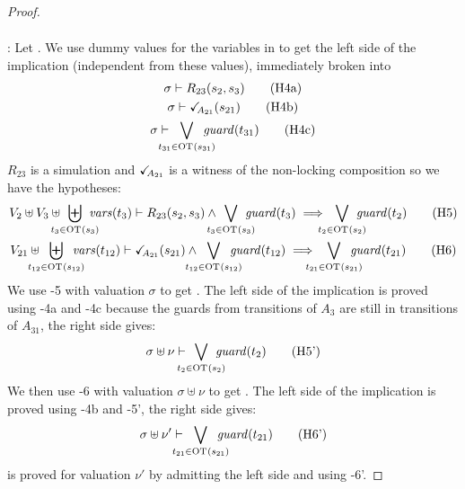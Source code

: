 \documentclass{article}
\begin{document}
\begin{proof}
\begin{align*}
	\end{align*}
\item[\goal{1}:] Let .
	We use dummy values for the variables in  to get the left side of the implication (independent from these values), immediately broken into
	\begin{gather}
		\sigma \vdash R_{23}\mpar{s_2, s_3} \hyp{4a} \\
		\sigma \vdash \reach{A_{21}}\mpar{s_{21}} \hyp{4b} \\
		\sigma \vdash \bigvee_\subbox{t_{31} \in \fOT{s_{31}}} \fguard{t_{31}} \hyp{4c}
	\end{gather}
	\(R_{23}\) is a simulation and \(\checkmark_{\!\! A_{21}}\) is a witness of the non-locking composition so we have the hypotheses:
	\begin{gather}
		V_2 \uplus V_3 \uplus \biguplus_\subbox{t_3 \in \fOT{s_3}} \fvars{t_3} \vdash R_{23}\mpar{s_2, s_3} \wedge \bigvee_\subbox{t_3 \in \fOT{s_3}} \fguard{t_3} \implies \bigvee_\subbox{t_2 \in \fOT{s_2}} \fguard{t_2} \hyp{5} \\
		V_{21} \uplus \biguplus_\subbox{t_{12} \in \fOT{s_{12}}} \fvars{t_{12}} \vdash \reach{A_{21}}\mpar{s_{21}} \wedge \bigvee_\subbox{t_{12} \in \fOT{s_{12}}} \fguard{t_{12}} \implies \bigvee_\subbox{t_{21} \in \fOT{s_{21}}} \fguard{t_{21}} \hyp{6}
	\end{gather}
	We use \hyp{5} with valuation \(\sigma\) to get .
	The left side of the implication is proved using \hyp{4a} and \hyp{4c} because the guards from transitions of \(A_3\) are still in transitions of \(A_{31}\), the right side gives:
	\[ \sigma \uplus \nu \vdash \bigvee_\subbox{t_2 \in \fOT{s_2}} \fguard{t_2} \hyp{5'} \]
	We then use \hyp{6} with valuation \(\sigma \uplus \nu\) to get .
	The left side of the implication is proved using \hyp{4b} and \hyp{5'}, the right side gives:
	\[ \sigma \uplus \nu' \vdash \bigvee_\subbox{t_{21} \in \fOT{s_{21}}} \fguard{t_{21}} \hyp{6'} \]
	 is proved for valuation \(\nu'\) by admitting the left side and using \hyp{6'}.
\end{proof}
\end{document}
